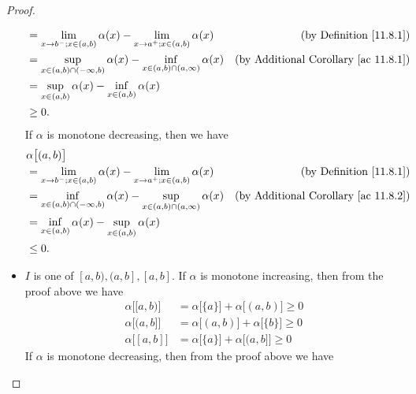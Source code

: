 \begin{proof}
\begin{itemize}
\begin{align*}
                   & = \lim_{x \to b^- ; x \in (a, b)} \alpha(x) - \lim_{x \to a^+ ; x \in (a, b)} \alpha(x)            & \text{(by Definition \ref{11.8.1})}              \\
                   & = \sup_{x \in (a, b) \cap (-\infty, b)} \alpha(x) - \inf_{x \in (a, b) \cap (a, \infty)} \alpha(x) & \text{(by Additional Corollary \ref{ac 11.8.1})} \\
                   & = \sup_{x \in (a, b)} \alpha(x) - \inf_{x \in (a, b)} \alpha(x)                                                                                       \\
                   & \geq 0.
              \end{align*}
              If \(\alpha\) is monotone decreasing, then we have
              \begin{align*}
                   & \alpha\big[(a, b)\big]                                                                                                                                \\
                   & = \lim_{x \to b^- ; x \in (a, b)} \alpha(x) - \lim_{x \to a^+ ; x \in (a, b)} \alpha(x)            & \text{(by Definition \ref{11.8.1})}              \\
                   & = \inf_{x \in (a, b) \cap (-\infty, b)} \alpha(x) - \sup_{x \in (a, b) \cap (a, \infty)} \alpha(x) & \text{(by Additional Corollary \ref{ac 11.8.2})} \\
                   & = \inf_{x \in (a, b)} \alpha(x) - \sup_{x \in (a, b)} \alpha(x)                                                                                       \\
                   & \leq 0.
              \end{align*}
        \item \(I\) is one of \([a, b), (a, b], [a, b]\).
              If \(\alpha\) is monotone increasing, then from the proof above we have
              \begin{align*}
                  \alpha\big[[a, b)\big] & = \alpha\big[\{a\}\big] + \alpha\big[(a, b)\big] \geq 0 \\
                  \alpha\big[(a, b]\big] & = \alpha\big[(a, b)\big] + \alpha\big[\{b\}\big] \geq 0 \\
                  \alpha\big[[a, b]\big] & = \alpha\big[\{a\}\big] + \alpha\big[(a, b]\big] \geq 0
              \end{align*}
              If \(\alpha\) is monotone decreasing, then from the proof above we have

\end{itemize}
\end{proof}
